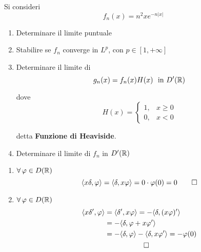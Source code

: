 Si consideri
\begin{equation*}
f_{n}(x) = n^{2} xe^{ - n| x| }
\end{equation*}
\begin{enumerate}
\item Determinare il limite puntuale
\item Stabilire se $f_{n}$ converge in $L^{p}$, con $p\in [ 1, + \infty ]$
\item Determinare il limite di
\begin{equation*}
g_{n}(x) = f_{n}(x) H(x) \ \ \text{in} \ D'(\mathbb{R})
\end{equation*}

dove
\begin{equation*}
H(x) = 
\begin{cases}
1, & x\geq 0\\
0, & x < 0
\end{cases}
\end{equation*}

detta \textbf{Funzione di Heaviside}.
\item Determinare il limite di $f_{n}$ in $D'(\mathbb{R})$
\end{enumerate}
\ParteSoluzioni
\Soluzione
\begin{enumerate}
\item $\forall \varphi \in D(\RR)$
\begin{equation*}
\langle x\delta ,\varphi \rangle = \langle \delta ,x\varphi \rangle = 0\cdot \varphi (0) = 0\qed 
\end{equation*}
\item $\forall \varphi \in D(\RR)$
\begin{gather*}
\begin{aligned}
\langle x\delta ',\varphi \rangle  & = \langle \delta ',x\varphi \rangle = - \langle \delta ,(x\varphi) '\rangle \\
 & = - \langle \delta ,\varphi + x\varphi '\rangle \\
 & = - \langle \delta ,\varphi \rangle - \langle \delta ,x\varphi '\rangle = - \varphi (0)
\end{aligned}\\
\qed 
\end{gather*}
\end{enumerate}
\Soluzione

